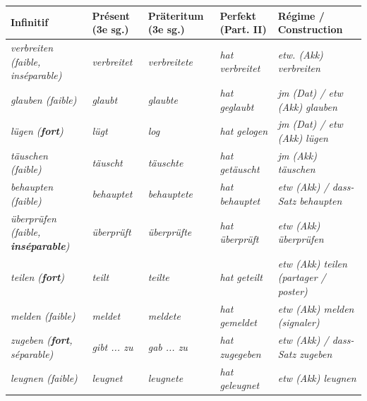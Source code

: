 \documentclass[11pt]{article}
\newcommand{\all}[1]{\ifmmode\text{\textit{#1}}\else\begingroup\selectlanguage{ngerman}\itshape #1\endgroup\fi}
\begin{document}
\begin{propriete}
\begin{center}
\begin{tabularx}{\linewidth}{|X|X|X|X|X|}
\hline
\rowcolor{popgreenL}
\textbf{Infinitif} & \textbf{Présent (3e sg.)} & \textbf{Präteritum (3e sg.)} & \textbf{Perfekt (Part. II)} & \textbf{Régime / Construction} \\
\hline
\all{verbreiten} (faible, inséparable) & \all{verbreitet} & \all{verbreitete} & \all{hat verbreitet} & \all{etw. (Akk) verbreiten} \\
\hline
\all{glauben} (faible) & \all{glaubt} & \all{glaubte} & \all{hat geglaubt} & \all{jm (Dat) / etw (Akk) glauben} \\
\hline
\all{lügen} (\textbf{fort}) & \all{lügt} & \all{log} & \all{hat gelogen} & \all{jm (Dat) / etw (Akk) lügen} \\
\hline
\all{täuschen} (faible) & \all{täuscht} & \all{täuschte} & \all{hat getäuscht} & \all{jm (Akk) täuschen} \\
\hline
\all{behaupten} (faible) & \all{behauptet} & \all{behauptete} & \all{hat behauptet} & \all{etw (Akk) / dass-Satz behaupten} \\
\hline
\all{überprüfen} (faible, \textbf{inséparable}) & \all{überprüft} & \all{überprüfte} & \all{hat überprüft} & \all{etw (Akk) überprüfen} \\
\hline
\all{teilen} (\textbf{fort}) & \all{teilt} & \all{teilte} & \all{hat geteilt} & \all{etw (Akk) teilen} (partager / poster) \\
\hline
\all{melden} (faible) & \all{meldet} & \all{meldete} & \all{hat gemeldet} & \all{etw (Akk) melden} (signaler) \\
\hline
\all{zugeben} (\textbf{fort}, séparable) & \all{gibt ... zu} & \all{gab ... zu} & \all{hat zugegeben} & \all{etw (Akk) / dass-Satz zugeben} \\
\hline
\all{leugnen} (faible) & \all{leugnet} & \all{leugnete} & \all{hat geleugnet} & \all{etw (Akk) leugnen} \\
\hline
\end{tabularx}
\end{center}
\end{propriete}
\end{document}
